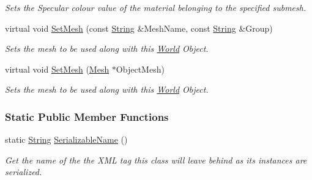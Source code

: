\begin{DoxyCompactItemize}
\begin{DoxyCompactList}\small\item\em Sets the Specular colour value of the material belonging to the specified submesh. \item\end{DoxyCompactList}\item 
virtual void \hyperlink{classMezzanine_1_1WorldObjectGraphicsSettings_a33259391dac7ba356848da9b27cc0a4a}{SetMesh} (const \hyperlink{namespaceMezzanine_acf9fcc130e6ebf08e3d8491aebcf1c86}{String} \&MeshName, const \hyperlink{namespaceMezzanine_acf9fcc130e6ebf08e3d8491aebcf1c86}{String} \&Group)
\begin{DoxyCompactList}\small\item\em Sets the mesh to be used along with this \hyperlink{classMezzanine_1_1World}{World} Object. \item\end{DoxyCompactList}\item 
virtual void \hyperlink{classMezzanine_1_1WorldObjectGraphicsSettings_a29ebce82dbfd0a27ddf385504341569c}{SetMesh} (\hyperlink{classMezzanine_1_1Mesh}{Mesh} $\ast$ObjectMesh)
\begin{DoxyCompactList}\small\item\em Sets the mesh to be used along with this \hyperlink{classMezzanine_1_1World}{World} Object. \item\end{DoxyCompactList}\end{DoxyCompactItemize}
\subsubsection*{Static Public Member Functions}
\begin{DoxyCompactItemize}
\item 
static \hyperlink{namespaceMezzanine_acf9fcc130e6ebf08e3d8491aebcf1c86}{String} \hyperlink{classMezzanine_1_1WorldObjectGraphicsSettings_adfcbfa444f5b443ea176daf3279a8193}{SerializableName} ()
\begin{DoxyCompactList}\small\item\em Get the name of the the XML tag this class will leave behind as its instances are serialized. \item\end{DoxyCompactList}\end{DoxyCompactItemize}
